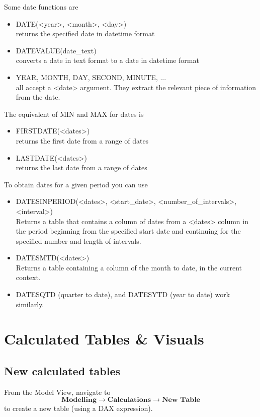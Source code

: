 \documentclass[10pt, openany, twocolumn]{book}
\begin{document}
Some date functions are 

\begin{itemize}
    \item DATE(<year>, <month>, <day>)\\ returns the specified date in datetime format
    \item DATEVALUE(date\_text)\\ converts a date in text format to a date in datetime format
    \item YEAR, MONTH, DAY, SECOND, MINUTE, ... \\ all accept a <date> argument. They extract the relevant piece of information from the date.
\end{itemize}

The equivalent of MIN and MAX for dates is
\begin{itemize}
    \item FIRSTDATE(<dates>) \\ returns the first date from a range of dates
    \item LASTDATE(<dates>) \\ returns the last date from a range of dates
\end{itemize}

To obtain dates for a given period you can use
\begin{itemize}
    \item DATESINPERIOD(<dates>, <start\_date>, <number\_of\_intervals>, <interval>)\\ Returns a table that contains a column of dates from a <dates> column in the period beginning from the specified start date and continuing for the specified number and length of intervals.
    \item DATESMTD(<dates>) \\ Returns a table containing a column of the month to date, in the current context.
    \item DATESQTD (quarter to date), and DATESYTD (year to date) work similarly.
\end{itemize}

\section{Calculated Tables \& Visuals}

\subsection*{New calculated tables}
From the Model View, navigate to 
$$\textbf{Modelling} \rightarrow \textbf{Calculations} \rightarrow \textbf{New Table}$$
to create a new table (using a DAX expression).\\
\end{document}
